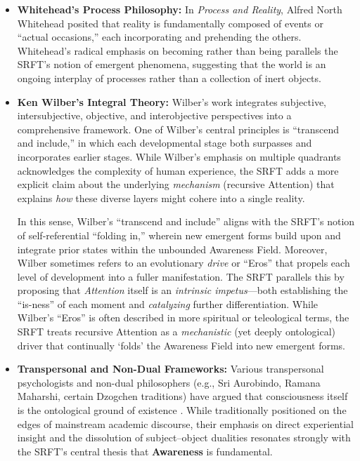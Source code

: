 \documentclass[12pt,a4paper]{article}
\begin{document}
\begin{itemize}
    \item \textbf{Whitehead’s Process Philosophy:} 
    In \emph{Process and Reality}, Alfred North Whitehead \cite{whitehead1929process} posited that reality is fundamentally composed of events or ``actual occasions,'' each incorporating and prehending the others. Whitehead’s radical emphasis on becoming rather than being parallels the SRFT’s notion of emergent phenomena, suggesting that the world is an ongoing interplay of processes rather than a collection of inert objects.

    \item \textbf{Ken Wilber’s Integral Theory:}
    Wilber’s work \cite{wilber1995sex, wilber2007integral, wilber2000brief} integrates subjective, intersubjective, objective, and interobjective perspectives into a comprehensive framework. One of Wilber’s central principles is “transcend and include,” in which each developmental stage both surpasses and incorporates earlier stages. While Wilber’s emphasis on multiple quadrants acknowledges the complexity of human experience, the SRFT adds a more explicit claim about the underlying \emph{mechanism} (recursive Attention) that explains \emph{how} these diverse layers might cohere into a single reality.
    
    In this sense, Wilber’s “transcend and include” aligns with the SRFT’s notion of self-referential “folding in,” wherein new emergent forms build upon and integrate prior states within the unbounded Awareness Field. Moreover, Wilber sometimes refers to an evolutionary \emph{drive} or “Eros” that propels each level of development into a fuller manifestation. The SRFT parallels this by proposing that \emph{Attention} itself is an \emph{intrinsic impetus}—both establishing the “is-ness” of each moment and \emph{catalyzing} further differentiation. While Wilber’s “Eros” is often described in more spiritual or teleological terms, the SRFT treats recursive Attention as a \emph{mechanistic} (yet deeply ontological) driver that continually ‘folds’ the Awareness Field into new emergent forms.
    
    \item \textbf{Transpersonal and Non-Dual Frameworks:} 
    Various transpersonal psychologists and non-dual philosophers (e.g., Sri Aurobindo, Ramana Maharshi, certain Dzogchen traditions) have argued that consciousness itself is the ontological ground of existence \cite{ramacandra1923upanishads, garfield2002emptiness}. While traditionally positioned on the edges of mainstream academic discourse, their emphasis on direct experiential insight and the dissolution of subject--object dualities resonates strongly with the SRFT’s central thesis that \textbf{Awareness} is fundamental.
\end{itemize}
\end{document}
